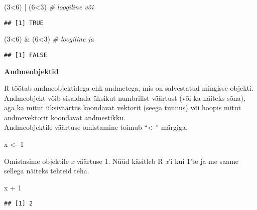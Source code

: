 \documentclass[
]{book}
\newenvironment{Shaded}{\begin{snugshade}}{\end{snugshade}}
\newcommand{\CommentTok}[1]{\textcolor[rgb]{0.56,0.35,0.01}{\textit{#1}}}
\newcommand{\DecValTok}[1]{\textcolor[rgb]{0.00,0.00,0.81}{#1}}
\newcommand{\NormalTok}[1]{#1}
\newcommand{\OtherTok}[1]{\textcolor[rgb]{0.56,0.35,0.01}{#1}}
\newcommand{\SpecialCharTok}[1]{\textcolor[rgb]{0.00,0.00,0.00}{#1}}
\begin{document}
\begin{Shaded}
\begin{Highlighting}[]
\NormalTok{(}\DecValTok{3}\SpecialCharTok{\textless{}}\DecValTok{6}\NormalTok{) }\SpecialCharTok{|}\NormalTok{ (}\DecValTok{6}\SpecialCharTok{\textless{}}\DecValTok{3}\NormalTok{) }\CommentTok{\# loogiline või}
\end{Highlighting}
\end{Shaded}

\begin{verbatim}
## [1] TRUE
\end{verbatim}

\begin{Shaded}
\begin{Highlighting}[]
\NormalTok{(}\DecValTok{3}\SpecialCharTok{\textless{}}\DecValTok{6}\NormalTok{) }\SpecialCharTok{\&}\NormalTok{ (}\DecValTok{6}\SpecialCharTok{\textless{}}\DecValTok{3}\NormalTok{) }\CommentTok{\# loogiline ja}
\end{Highlighting}
\end{Shaded}

\begin{verbatim}
## [1] FALSE
\end{verbatim}

\textbf{Andmeobjektid}

R töötab andmeobjektidega ehk andmetega, mis on salvestatud mingisse objekti. Andmeobjekt võib sisaldada üksikut numbrilist väärtust (või ka näiteks sõna), aga ka mitut üksiväärtus koondavat vektorit (seega tunnus) või hoopis mitut andmevektorit koondavat andmestikku.\\
Andmeobjektile väärtuse omistamine toimub ``\textless-'' märgiga.

\begin{Shaded}
\begin{Highlighting}[]
\NormalTok{x }\OtherTok{\textless{}{-}} \DecValTok{1}
\end{Highlighting}
\end{Shaded}

Omistasime objektile \emph{x} väärtuse 1. Nüüd käsitleb R \emph{x}'i kui 1'te ja me saame sellega näiteks tehteid teha.

\begin{Shaded}
\begin{Highlighting}[]
\NormalTok{x }\SpecialCharTok{+} \DecValTok{1}
\end{Highlighting}
\end{Shaded}

\begin{verbatim}
## [1] 2
\end{verbatim}
\end{document}
